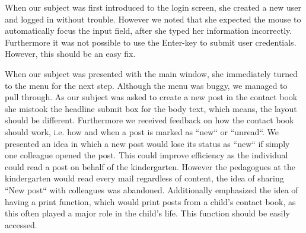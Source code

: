 When our subject was first introduced to the login screen, she created a new user and logged in without trouble. However we noted that she expected the mouse to automatically focus the input field, after she typed her information incorrectly. Furthermore it was not possible to use the Enter-key to submit user credentials. However, this should be an easy fix.

When our subject was presented with the main window, she immediately turned to the menu for the next step. Although the menu was buggy, we managed to pull through. As our subject was asked to create a new post in the contact book she mistook the headline submit box for the body text, which means, the layout should be different. 
Furthermore we received feedback on how the contact book should work, i.e. how and when a post is marked as ``new`` or ``unread``. We presented an idea in which a new post would lose its status as ``new`` if simply one colleague opened the post. This could improve efficiency as the individual could read a post on behalf of the kindergarten. However the pedagogues at the kindergarten would read every mail regardless of content, the idea of sharing ``New post`` with colleagues was abandoned. 
Additionally emphasized the idea of having a print function, which would print posts from a child's contact book, as this often played a major role in the child's life. This function should be easily accessed.


